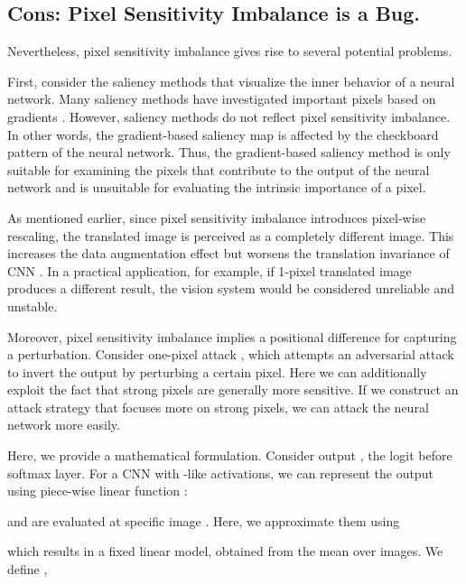 \documentclass[letterpaper]{article} \usepackage{aaai22}  \usepackage{times}  \usepackage{helvet}  \usepackage{courier}  \usepackage[hyphens]{url}  \usepackage{graphicx} \urlstyle{rm} \def\UrlFont{\rm}  \usepackage{natbib}  \usepackage{caption} \DeclareCaptionStyle{ruled}{labelfont=normalfont,labelsep=colon,strut=off} \frenchspacing  \setlength{\pdfpagewidth}{8.5in}  \setlength{\pdfpageheight}{11in}  \usepackage{algorithm}
\begin{document}
\subsection{Cons: Pixel Sensitivity Imbalance is a Bug.}
\label{sec:Cons_Pixel_Sensitivity_Imbalance_is_a_Bug}

Nevertheless, pixel sensitivity imbalance gives rise to several potential problems.

First, consider the saliency methods that visualize the inner behavior of a neural network. Many saliency methods have investigated important pixels based on gradients \cite{simonyan2013deep,springenberg2014striving,smilkov2017smoothgrad,sundararajan2017axiomatic,shrikumar2017learning}. However, saliency methods do not reflect pixel sensitivity imbalance. In other words, the gradient-based saliency map is affected by the checkboard pattern of the neural network. Thus, the gradient-based saliency method is only suitable for examining the pixels that contribute to the output of the neural network and is unsuitable for evaluating the intrinsic importance of a pixel.

As mentioned earlier, since pixel sensitivity imbalance introduces pixel-wise rescaling, the translated image is perceived as a completely different image. This increases the data augmentation effect but worsens the translation invariance of CNN \cite{zhang2019making,azulay2018deep,cohen2016group}. In a practical application, for example, if 1-pixel translated image produces a different result, the vision system would be considered unreliable and unstable.

Moreover, pixel sensitivity imbalance implies a positional difference for capturing a perturbation. Consider one-pixel attack \cite{su2019one}, which attempts an adversarial attack to invert the output by perturbing a certain pixel. Here we can additionally exploit the fact that strong pixels are generally more sensitive. If we construct an attack strategy that focuses more on strong pixels, we can attack the neural network more easily.

Here, we provide a mathematical formulation. Consider output , the logit before softmax layer. For a CNN with -like activations, we can represent the output using piece-wise linear function \cite{srinivas2018knowledge,simonyan2013deep}:


 and  are evaluated at specific image . Here, we approximate them using

which results in a fixed linear model, obtained from the mean over images. We define ,
\end{document}

